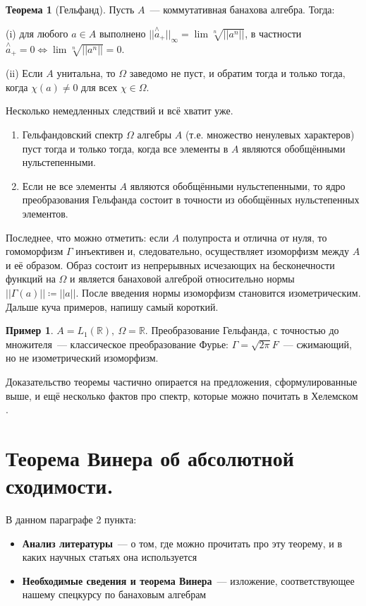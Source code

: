 \documentclass[12pt]{extarticle}
\theoremstyle{definition}
\newtheorem{theorem}{\indent Теорема}[section]
\newtheorem*{example}{\indent Пример}%
\begin{document}
     \begin{theorem}[Гельфанд]\label{th:Gelfand2}
     Пусть $A$~--- коммутативная банахова алгебра. Тогда:

     (i) для любого $a \in A$ выполнено $||\stackrel{\wedge}{a}_+||_{\infty} = \lim \sqrt[n]{||a^n||}$, в частности $\stackrel{\wedge}{a}_+ = 0 \Leftrightarrow \lim \sqrt[n]{||a^n||} = 0$.

     (ii) Если $A$ унитальна, то $\Omega$ заведомо не пуст, и обратим тогда и только тогда, когда $\chi(a) \neq 0$ для всех $\chi \in \Omega$.
      \end{theorem}
      Несколько немедленных следствий и всё хватит уже.
      \begin{enumerate}
        \item Гельфандовский спектр $\Omega$ алгебры $A$ (т.е. множество ненулевых характеров) пуст тогда и только тогда, когда все элементы в $A$ являются обобщёнными нульстепенными.
        \item Если не все элементы $A$ являются обобщёнными нульстепенными, то ядро преобразования Гельфанда состоит в точности из обобщённых нульстепенных элементов.
      \end{enumerate}

      Последнее, что можно отметить: если $A$ полупроста и отлична от нуля, то гомоморфизм $\Gamma$ инъективен и, следовательно, осуществляет изоморфизм между $A$ и её образом. Образ состоит из непрерывных исчезающих на бесконечности функций на $\Omega$ и является банаховой алгеброй относительно нормы $||\Gamma(a)|| \coloneq ||a||$. После введения нормы изоморфизм становится изометрическим. Дальше куча примеров, напишу самый короткий.
      \begin{example}
          $A = L_1(\mathds{R}),\ \Omega = \mathds{R}$. Преобразование Гельфанда, с точностью до множителя~--- классическое преобразование Фурье: $\Gamma = \sqrt{2\pi} F$~--- сжимающий, но не изометрический изоморфизм.
      \end{example}
      Доказательство теоремы частично опирается на предложения, сформулированные выше, и ещё несколько фактов про спектр, которые можно почитать в Хелемском \cite{helemski}.
    \section[Теорема Винера.]{Теорема Винера об абсолютной сходимости.}
    В данном параграфе 2 пункта:
	\begin{itemize}
		\item \textbf{Анализ литературы}~--- о том, где можно прочитать про эту теорему, и в каких научных статьях она используется
		\item \textbf{Необходимые сведения и теорема Винера}~--- изложение, соответствующее нашему спецкурсу по банаховым алгебрам
	\end{itemize}
\end{document}
